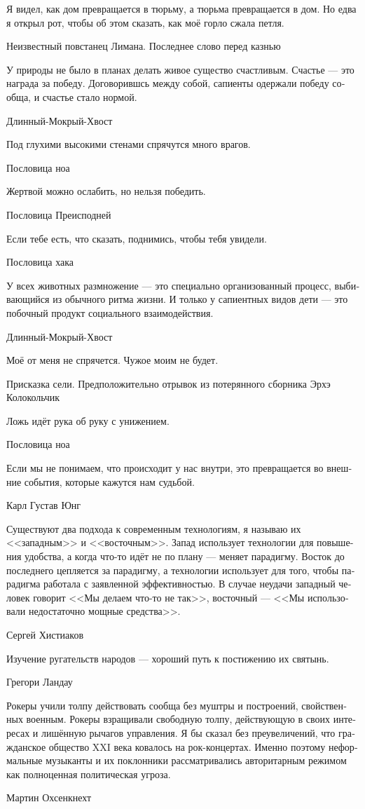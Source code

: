 \documentclass[a4paper,12pt,fleqn]{book}\usepackage{cooltooltips}\usepackage{polyglossia}\setdefaultlanguage[babelshorthands=true]{russian}\setotherlanguage{english}\defaultfontfeatures{Ligatures=TeX,Mapping=tex-text} \usepackage{xcolor}\definecolor{lightgray}{HTML}{bbbbbb}\color{lightgray}\newcommand{\ml}[3]{\textenglish{\textcolor{black}{#3}}}
\begin{document}
{\epigraph
{Я видел, как дом превращается в тюрьму, а тюрьма превращается в дом.
Но едва я открыл рот, чтобы об этом сказать, как моё горло сжала петля.}
{Неизвестный повстанец Лимана.
Последнее слово перед казнью}

\epigraph{У природы не было в планах делать живое существо счастливым.
Счастье --- это награда за победу.
Договорившсь между собой, сапиенты одержали победу сообща, и счастье стало нормой.}
{Длинный-Мокрый-Хвост}

\epigraph{Под глухими высокими стенами спрячутся много врагов.}
{Пословица ноа}

\epigraph
{Жертвой можно ослабить, но нельзя победить.}
{Пословица Преисподней}

\epigraph
{Если тебе есть, что сказать, поднимись, чтобы тебя увидели.}
{Пословица хака}

\epigraph
{У всех животных размножение --- это специально организованный процесс, выбивающийся из обычного ритма жизни.
И только у сапиентных видов дети --- это побочный продукт социального взаимодействия.}
{Длинный-Мокрый-Хвост}

\epigraph
{Моё от меня не спрячется.
Чужое моим не будет.}
{Присказка сели.
Предположительно отрывок из потерянного сборника Эрхэ Колокольчик}

\epigraph
{Ложь идёт рука об руку с унижением.}
{Пословица ноа}

\epigraph
{Если мы не понимаем, что происходит у нас внутри, это превращается во внешние события, которые кажутся нам судьбой.}
{Карл Густав Юнг}

\epigraph
{Существуют два подхода к современным технологиям, я называю их <<западным>> и <<восточным>>.
Запад использует технологии для повышения удобства, а когда что-то идёт не по плану --- меняет парадигму.
Восток до последнего цепляется за парадигму, а технологии использует для того, чтобы парадигма работала с заявленной эффективностью.
В случае неудачи западный человек говорит <<Мы делаем что-то не так>>, восточный --- <<Мы использовали недостаточно мощные средства>>.}
{Сергей Хистиаков}

\epigraph{Изучение ругательств народов --- хороший путь к постижению их святынь.}
{Грегори Ландау}

\epigraph
{Рокеры учили толпу действовать сообща без муштры и построений, свойственных военным.
Рокеры взращивали свободную толпу, действующую в своих интересах и лишённую рычагов управления.
Я бы сказал без преувеличений, что гражданское общество XXI века ковалось на рок-концертах.
Именно поэтому неформальные музыканты и их поклонники рассматривались авторитарным режимом как полноценная политическая угроза.}
{Мартин Охсенкнехт}

}
\end{document}
